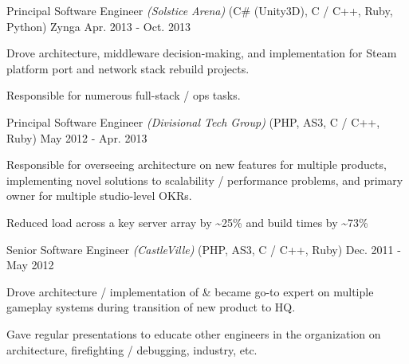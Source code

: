 \begin{cventries}

  \cventry
    {{\color{awesome}Principal Software Engineer} \textit{(Solstice Arena)} (C\# (Unity3D), C / C++, Ruby, Python)} %
    {Zynga} %
    {} %
    {Apr. 2013 - Oct. 2013} %
    { %
      \begin{cvitems}
        \item {Drove architecture, middleware decision-making, and implementation for Steam platform port and network stack rebuild projects.}
        \item {Responsible for numerous full-stack / ops tasks.}
      \end{cvitems}
    }


  \cventry
    {{\color{awesome}Principal Software Engineer} \textit{(Divisional Tech Group)} (PHP, AS3, C / C++, Ruby)} %
    {} %
    {} %
    {May 2012 - Apr. 2013} %
    { %
      \begin{cvitems}
        \item {Responsible for overseeing architecture on new features for multiple products, implementing novel solutions to scalability / performance problems, and primary owner for multiple studio-level OKRs.}
        \item {Reduced load across a key server array by \textasciitilde25\% and build times by \textasciitilde73\%}
      \end{cvitems}
    }


  \cventry
    {{\color{awesome}Senior Software Engineer} \textit{(CastleVille)} (PHP, AS3, C / C++, Ruby)} %
    {} %
    {} %
    {Dec. 2011 - May 2012} %
    { %
      \begin{cvitems}
        \item {Drove architecture / implementation of \& became go-to expert on multiple gameplay systems during transition of new product to HQ.}
        \item {Gave regular presentations to educate other engineers in the organization on architecture, firefighting / debugging, industry, etc.}
      \end{cvitems}
    }


\end{cventries}
